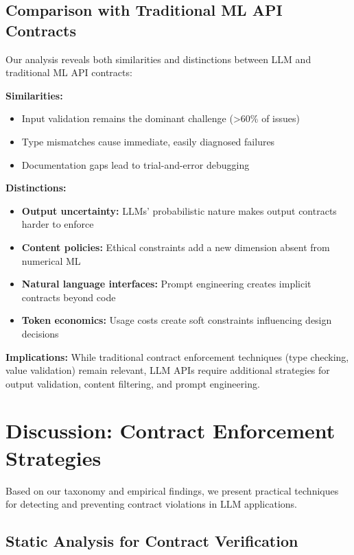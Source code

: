 \documentclass[11pt]{article}
\begin{document}
\subsection{Comparison with Traditional ML API Contracts}

Our analysis reveals both similarities and distinctions between LLM and traditional ML API contracts:

\textbf{Similarities:}
\begin{itemize}
    \item Input validation remains the dominant challenge (>60\% of issues)
    \item Type mismatches cause immediate, easily diagnosed failures
    \item Documentation gaps lead to trial-and-error debugging
\end{itemize}

\textbf{Distinctions:}
\begin{itemize}
    \item \textbf{Output uncertainty:} LLMs' probabilistic nature makes output contracts harder to enforce
    \item \textbf{Content policies:} Ethical constraints add a new dimension absent from numerical ML
    \item \textbf{Natural language interfaces:} Prompt engineering creates implicit contracts beyond code
    \item \textbf{Token economics:} Usage costs create soft constraints influencing design decisions
\end{itemize}

\textbf{Implications:} While traditional contract enforcement techniques (type checking, value validation) remain relevant, LLM APIs require additional strategies for output validation, content filtering, and prompt engineering.

\section{Discussion: Contract Enforcement Strategies}
\label{sec:enforcement}

Based on our taxonomy and empirical findings, we present practical techniques for detecting and preventing contract violations in LLM applications.

\subsection{Static Analysis for Contract Verification}
\end{document}
